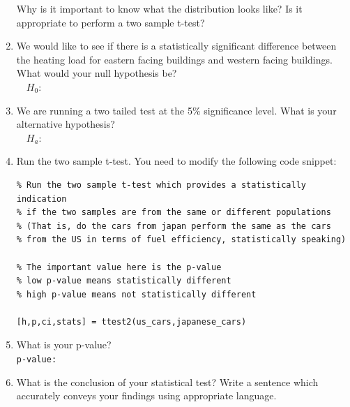 \documentclass[12pt]{article}
\begin{document}
\begin{enumerate}
Why is it important to know what the distribution looks like? Is it appropriate to perform a two sample t-test?

\item We would like to see if there is a statistically significant difference between the heating load for eastern facing buildings and western facing buildings. What would your null hypothesis be?\\

$\quad H_0:$
\vspace{0.2cm}

\item We are running a two tailed test at the 5\% significance level. What is your alternative hypothesis?\\

$\quad H_a:$
\vspace{0.2cm}

\item Run the two sample t-test. You need to modify the following code snippet:
\vspace{-0.4cm}
\begin{lstlisting}
% Run the two sample t-test which provides a statistically indication
% if the two samples are from the same or different populations
% (That is, do the cars from japan perform the same as the cars
% from the US in terms of fuel efficiency, statistically speaking)

% The important value here is the p-value
% low p-value means statistically different
% high p-value means not statistically different

[h,p,ci,stats] = ttest2(us_cars,japanese_cars)
\end{lstlisting}

\item What is your p-value?\\

\verb|p-value:|
\vspace{0.2cm}

\item What is the conclusion of your statistical test? Write a sentence which accurately conveys your findings using appropriate language.
\end{enumerate}
\end{document}
